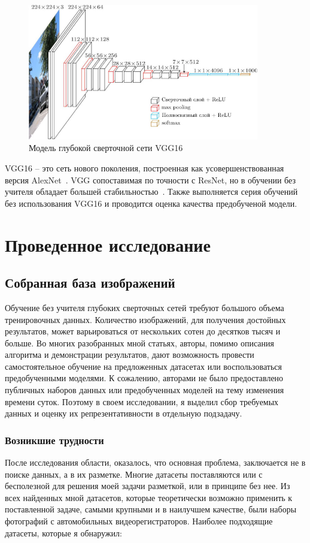 \documentclass[11pt,a4paper]{extarticle}
\begin{document}
{			\begin{figure}[ht]
				\includegraphics[width=0.9\textwidth]{img/vgg16}
					\caption{Модель глубокой сверточной сети VGG16}
				\label{pic:model}
			\end{figure}
			\noindent
			VGG16 -- это сеть нового поколения, построенная как усовершенствованная версия AlexNet~\cite{AlexNet}. 
			VGG сопоставимая по точности с ResNet, но в обучении без учителя обладает большей стабильностью~\cite{MUNIT}.
			Также выполняется серия обучений без использования VGG16 и проводится оценка качества предобученой модели. 


\newpage
\section{Проведенное исследование}
	
	\subsection{Собранная база изображений}\label{sec:data}
		
		Обучение без учителя глубоких сверточных сетей требуют большого объема тренировочных данных.
		Количество изображений, для получения достойных результатов, может варьироваться от нескольких сотен до десятков тысяч и больше.
		Во многих разобранных мной статьях, авторы, помимо описания алгоритма и демонстрации результатов, дают возможность провести самостоятельное обучение на предложенных датасетах или воспользоваться предобученными моделями.
		К сожалению, авторами не было предоставлено публичных наборов данных или предобученных моделей на тему изменения времени суток.
		Поэтому в своем исследовании, я выделил сбор требуемых данных и оценку их репрезентативности в отдельную подзадачу.
		
		\subsubsection*{Возникшие трудности}\label{sec:difficulties}
		После исследования области, оказалось, что основная проблема, заключается не в поиске данных, а в их разметке. Многие датасеты поставляются или с бесполезной для решения моей задачи разметкой, или в принципе без нее.
		Из всех найденных мной датасетов, которые теоретически возможно применить к поставленной задаче, самыми крупными и в наилучшем качестве, были наборы фотографий с автомобильных видеорегистраторов.
		Наиболее подходящие датасеты, которые я обнаружил: 
		
}
\end{document}
